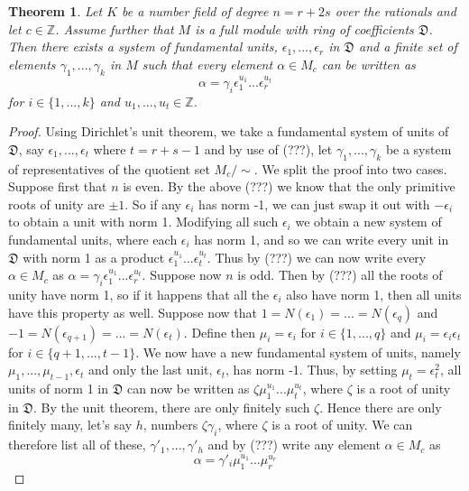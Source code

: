 \documentclass{article}
\newtheorem{theorem}{Theorem}[section]
\newcommand{\mfrak}[1]{\mathfrak{#1}}
\newcommand{\mbb}[1]{\mathbb{#1}}
\begin{document}
\begin{theorem}
    Let $K$ be a number field of degree $n = r + 2s$ over the rationals and let $c \in \mbb Z$. Assume further that $M$ is a full module with ring of coefficients $\mfrak D$. Then there exists a system of fundamental units, $\epsilon_1, ..., \epsilon_r$ in $\mfrak D$ and a finite set of elements $\gamma_1, ..., \gamma_k$ in $M$ such that every element $\alpha \in M_c$ can be written as 
    $$\alpha = \gamma_i \epsilon_1^{u_1} ... \epsilon_r^{u_t}$$
    for $i \in \{1, ..., k\}$ and $u_1, ..., u_t \in \mbb Z$.
\end{theorem}

\begin{proof}
    Using Dirichlet's unit theorem, we take a fundamental system of units of $\mfrak D$, say $\epsilon_1, ..., \epsilon_t$ where $t = r + s - 1$ and by use of (???), let $\gamma_1, ..., \gamma_k$ be a system of representatives of the quotient set $M_c / \sim$.
    We split the proof into two cases. Suppose first that $n$ is even. By the above (???) we know that the only primitive roots of unity are $\pm 1$. So if any $\epsilon_i$ has norm -1, we can just swap it out with $-\epsilon_i$ to obtain a unit with norm 1. Modifying all such $\epsilon_i$ we obtain a new system of fundamental units, where each $\epsilon_i$ has norm 1, and so we can write every unit in $\mfrak D$ with norm 1 as a product $\epsilon_1^{u_1}...\epsilon_t^{u_t}$. Thus by (???) we can now write every $\alpha \in M_c$ as $\alpha = \gamma_i \epsilon_1^{u_1}...\epsilon_r^{u_t}$. Suppose now $n$ is odd. Then by (???) all the roots of unity have norm 1, so if it happens that all the $\epsilon_i$ also have norm 1, then all units have this property as well. Suppose now that $1 = N(\epsilon_1) = ... = N(\epsilon_q)$ and $-1 = N(\epsilon_{q+1}) = ... = N(\epsilon_t)$. Define then 
    $\mu_i = \epsilon_i$ for $i \in \{1, ..., q\}$ and $\mu_i = \epsilon_i \epsilon_t$ for $i \in \{q+1, ..., t-1\}$. We now have a new fundamental system of units, namely $\mu_1, ..., \mu_{t-1},\epsilon_t$ and only the last unit, $\epsilon_t$, has norm -1. Thus, by setting $\mu_t = \epsilon_t^2$, all units of norm 1 in $\mfrak D$ can now be written as $\zeta \mu_1^{u_1}...\mu_t^{u_t}$, where $\zeta$ is a root of unity in $\mfrak D$. By the unit theorem, there are only finitely such $\zeta$. Hence there are only finitely many, let's say $h$, numbers $\zeta \gamma_i$, where $\zeta$ is a root of unity. We can therefore list all of these, $\gamma'_1, ..., \gamma'_h$ and by (???) write any element $\alpha \in M_c$ as 
    $$ \alpha = \gamma'_i \mu_1^{u_1} ... \mu_r^{u_r}$$
\end{proof}
\end{document}
